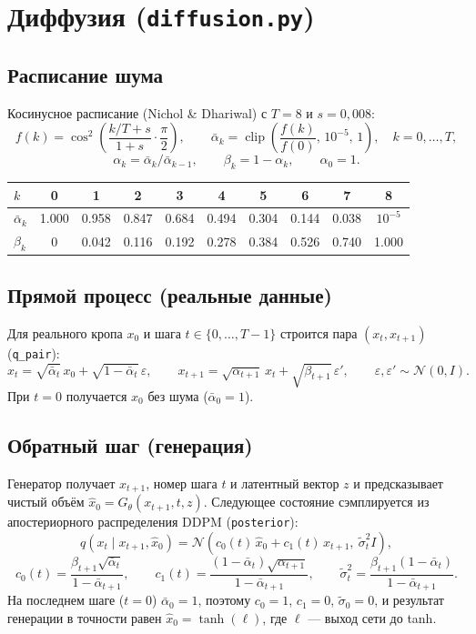 \documentclass[11pt,a4paper]{article}
\newcommand{\code}[1]{\texttt{#1}}
\newcommand{\abar}{\bar\alpha}
\begin{document}
\section{Диффузия (\code{diffusion.py})}

\subsection{Расписание шума}
Косинусное расписание (Nichol \& Dhariwal) с $T=8$ и $s=0{,}008$:
\[
  f(k) = \cos^2\!\left(\frac{k/T + s}{1+s}\cdot\frac{\pi}{2}\right),\qquad
  \abar_k = \operatorname{clip}\!\left(\frac{f(k)}{f(0)},\,10^{-5},\,1\right),\quad k=0,\dots,T,
\]
\[
  \alpha_k = \abar_k/\abar_{k-1},\qquad \beta_k = 1-\alpha_k,\qquad \alpha_0 = 1.
\]

\begin{center}
\small
\begin{tabular}{@{}lccccccccc@{}}
\toprule
$k$ & 0 & 1 & 2 & 3 & 4 & 5 & 6 & 7 & 8 \\
\midrule
$\abar_k$ & 1.000 & 0.958 & 0.847 & 0.684 & 0.494 & 0.304 & 0.144 & 0.038 & $10^{-5}$ \\
$\beta_k$ & 0 & 0.042 & 0.116 & 0.192 & 0.278 & 0.384 & 0.526 & 0.740 & 1.000 \\
\bottomrule
\end{tabular}
\end{center}

\subsection{Прямой процесс (реальные данные)}
Для реального кропа $x_0$ и шага $t\in\{0,\dots,T-1\}$ строится пара $(x_t, x_{t+1})$ (\code{q\_pair}):
\[
  x_t = \sqrt{\abar_t}\,x_0 + \sqrt{1-\abar_t}\,\varepsilon,\qquad
  x_{t+1} = \sqrt{\alpha_{t+1}}\,x_t + \sqrt{\beta_{t+1}}\,\varepsilon',\qquad
  \varepsilon,\varepsilon'\sim\mathcal N(0,I).
\]
При $t=0$ получается $x_0$ без шума ($\abar_0=1$).

\subsection{Обратный шаг (генерация)}
Генератор получает $x_{t+1}$, номер шага $t$ и латентный вектор $z$ и предсказывает чистый объём
$\hat x_0 = G_\theta(x_{t+1}, t, z)$. Следующее состояние сэмплируется из апостериорного распределения DDPM
(\code{posterior}):
\[
  q(x_t\mid x_{t+1}, \hat x_0) = \mathcal N\!\left(c_0(t)\,\hat x_0 + c_1(t)\,x_{t+1},\ \tilde\sigma_t^2 I\right),
\]
\[
  c_0(t) = \frac{\beta_{t+1}\sqrt{\abar_t}}{1-\abar_{t+1}},\qquad
  c_1(t) = \frac{(1-\abar_t)\sqrt{\alpha_{t+1}}}{1-\abar_{t+1}},\qquad
  \tilde\sigma_t^2 = \frac{\beta_{t+1}(1-\abar_t)}{1-\abar_{t+1}}.
\]
На последнем шаге ($t=0$) $\abar_0=1$, поэтому $c_0=1$, $c_1=0$, $\tilde\sigma_0=0$, и результат генерации
в точности равен $\hat x_0 = \tanh(\ell)$, где $\ell$ — выход сети до tanh.
\end{document}
